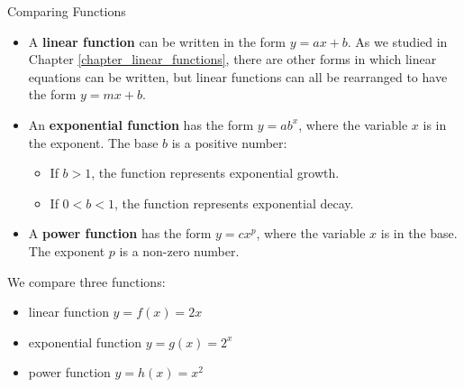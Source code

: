 \begin{summarybox}{Comparing Functions}
    \begin{itemize}
        \item A \textbf{linear function} can be written in the form \( y = ax + b \). As we studied in Chapter \ref{chapter_linear_functions}, there are other forms in which linear equations can be written, but linear functions can all be rearranged to have the form \( y = mx + b \).
        \item An \textbf{exponential function} has the form \( y = ab^x \), where the variable \( x \) is in the exponent. The base \( b \) is a positive number:
              \begin{itemize}
                  \item If \( b > 1 \), the function represents exponential growth.
                  \item If \( 0 < b < 1 \), the function represents exponential decay.
              \end{itemize}
        \item A \textbf{power function} has the form \( y = cx^p \), where the variable \( x \) is in the base. The exponent \( p \) is a non-zero number.

    \end{itemize}
\end{summarybox}

We compare three functions:
\begin{itemize}
    \item linear function \( y = f(x) = 2x \)
    \item exponential function \( y = g(x) = 2^x \)
    \item power function \( y = h(x) = x^2 \)
\end{itemize}

